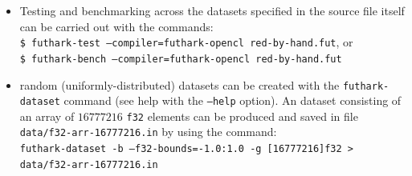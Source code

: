 \documentclass[acmsmall,review]{acmart}\settopmatter{printfolios=true,printccs=false,printacmref=false}
\begin{document}
\begin{itemize}
\begin{itemize}
            \item Testing and benchmarking across the datasets specified in
            the source file itself can be carried out with the commands:\\
             {\tt \$ futhark-test  --compiler=futhark-opencl red-by-hand.fut}, or\\
             {\tt \$ futhark-bench --compiler=futhark-opencl red-by-hand.fut}

            \item random (uniformly-distributed) datasets can be created with
            the {\tt futhark-dataset} command (see help with the {\tt --help} option).
            An dataset consisting of an array of $16777216$ \lstinline{f32}
            elements can be produced and saved in file  {\tt data/f32-arr-16777216.in}
            by using the command:\\
            {\tt futhark-dataset -b --f32-bounds=-1.0:1.0 -g [16777216]f32 > data/f32-arr-16777216.in}
            
        \end{itemize}


\end{itemize}
\end{document}
